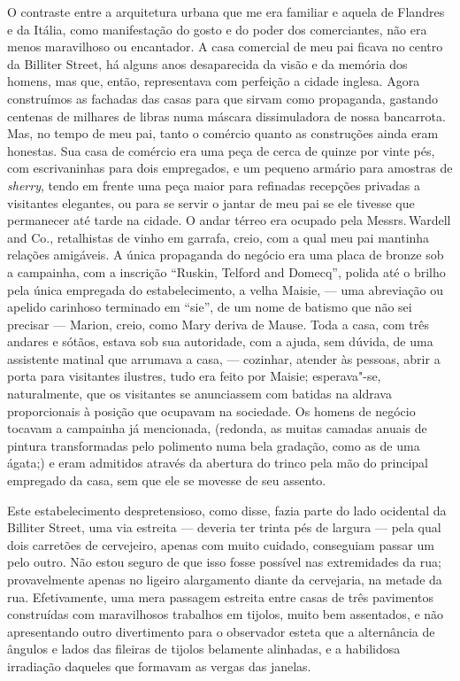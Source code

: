 O contraste entre a arquitetura urbana que me era familiar e aquela de
Flandres e da Itália, como manifestação do gosto e do poder dos
comerciantes, não era menos maravilhoso ou encantador. A casa comercial
de meu pai ficava no centro da Billiter Street, há alguns anos
desaparecida da visão e da memória dos homens, mas que, então,
representava com perfeição a cidade inglesa. Agora construímos as
fachadas das casas para que sirvam como propaganda, gastando centenas de
milhares de libras numa máscara dissimuladora de nossa bancarrota. Mas,
no tempo de meu pai, tanto o comércio quanto as construções ainda eram
honestas. Sua casa de comércio era uma peça de cerca de quinze por vinte
pés, com escrivaninhas para dois empregados, e um pequeno armário para
amostras de \textit{sherry}, tendo em frente uma peça maior para refinadas
recepções privadas a visitantes elegantes, ou para se servir o jantar de
meu pai se ele tivesse que permanecer até tarde na cidade. O andar
térreo era ocupado pela Messrs.\,Wardell and Co., retalhistas de vinho em
garrafa, creio, com a qual meu pai mantinha relações amigáveis. A única
propaganda do negócio era uma placa de bronze sob a campainha, com a
inscrição ``Ruskin, Telford and Domecq'', polida até o brilho pela
única empregada do estabelecimento, a velha Maisie, --- uma abreviação ou
apelido carinhoso terminado em ``sie'', de um nome de batismo que não
sei precisar --- Marion, creio, como Mary deriva de Mause. Toda a casa,
com três andares e sótãos, estava sob sua autoridade, com a ajuda, sem
dúvida, de uma assistente matinal que arrumava a casa, --- cozinhar,
atender às pessoas, abrir a porta para visitantes ilustres, tudo era \label{153}
feito por Maisie; esperava"-se, naturalmente, que os visitantes se
anunciassem com batidas na aldrava proporcionais à posição que ocupavam
na sociedade. Os homens de negócio tocavam a campainha já mencionada,
(redonda, as muitas camadas anuais de pintura transformadas pelo
polimento numa bela gradação, como as de uma ágata;) e eram admitidos
através da abertura do trinco pela mão do principal empregado da casa,
sem que ele se movesse de seu assento.

Este estabelecimento despretensioso, como disse, fazia parte do
lado ocidental da Billiter Street, uma via estreita --- deveria ter
trinta pés de largura --- pela qual dois carretões de cervejeiro, apenas
com muito cuidado, conseguiam passar um pelo outro. Não estou seguro de
que isso fosse possível nas extremidades da rua; provavelmente apenas no
ligeiro alargamento diante da cervejaria, na metade da rua.
Efetivamente, uma mera passagem estreita entre casas de três pavimentos
construídas com maravilhosos trabalhos em tijolos, muito bem assentados,
e não apresentando outro divertimento para o observador esteta que a
alternância de ângulos e lados das fileiras de tijolos belamente
alinhadas, e a habilidosa irradiação daqueles que formavam as vergas das
janelas.

